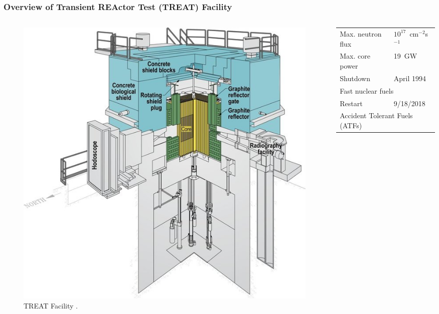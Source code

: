 \documentclass[fleqn]{beamer}
\begin{document}
    \begin{frame}
       \frametitle{Overview of Transient REActor Test (TREAT) Facility}
       \begin{columns}[c]
        \begin{column}{.5\textwidth}
         \begin{figure}
        \includegraphics[width = \textwidth]{key_component_treat.jpg}
        \caption{TREAT Facility \cite{bess2015baseline}.}
       \end{figure}
        \end{column}
        \begin{column}{.5\textwidth}
          \begin{tabular}{ll}
          \toprule
          Max. neutron flux & $10^{17}$~cm$^{-2}$s$^{-1}$\\
          Max. core power & 19~GW \\ %
          Shutdown & April 1994\\
          \multicolumn{2}{l}{Fast nuclear fuels}\\
          Restart & 9/18/2018\\
          \multicolumn{2}{l}{Accident Tolerant Fuels (ATFs)}\\
          \bottomrule
         \end{tabular}
        \end{column}
       \end{columns}
    \end{frame}
    
\end{document}
